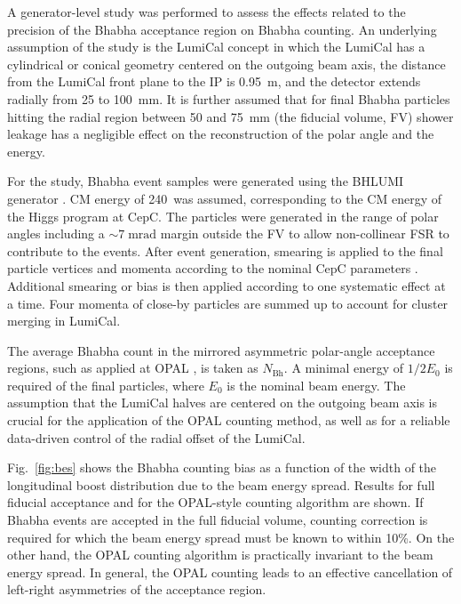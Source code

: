 A generator-level study was performed to assess the effects related to the precision of the Bhabha acceptance region on Bhabha counting. An underlying assumption of the study is the LumiCal concept in which the LumiCal has a cylindrical or conical geometry centered on the outgoing beam axis, the distance from the LumiCal front plane to the IP is 0.95~m, and the detector extends radially from 25 to 100~mm. It is further assumed that for final Bhabha particles hitting the radial region between 50 and 75~mm (the fiducial volume, FV) shower leakage has a negligible effect on the reconstruction of the polar angle and the energy.

For the study, Bhabha event samples were generated using the BHLUMI generator \cite{Bhlumi97}. CM energy of 240~\GeV was assumed, corresponding to the CM energy of the Higgs program at CepC. The particles were generated in the range of polar angles including a $\sim7\;\mathrm{mrad}$ margin outside the FV to allow non-collinear FSR to contribute to the events. After event generation, smearing is applied to the final particle vertices and momenta according to the nominal CepC parameters \cite{cepcweb}. Additional smearing or bias is then applied according to one systematic effect at a time. Four momenta of close-by particles are summed up to account for cluster merging in LumiCal.

The average Bhabha count in the mirrored asymmetric polar-angle acceptance regions, such as applied at OPAL \cite{opal2000}, is taken as $N_{\mathrm{Bh}}$. A minimal energy of $1/2E_0$ is required of the final particles, where $E_0$ is the nominal beam energy. The assumption that the LumiCal halves are centered on the outgoing beam axis is crucial for the application of the OPAL counting method, as well as for a reliable data-driven control of the radial offset of the LumiCal.

Fig.\ \ref{fig:bes} shows the Bhabha counting bias as a function of the width of the longitudinal boost distribution due to the beam energy spread. Results for full fiducial acceptance and for the OPAL-style counting algorithm are shown. If Bhabha events are accepted in the full fiducial volume, counting correction is required for which the beam energy spread must be known to within 10\%. On the other hand, the OPAL counting algorithm is practically invariant to the beam energy spread. In general, the OPAL counting leads to an effective cancellation of left-right asymmetries of the acceptance region.

